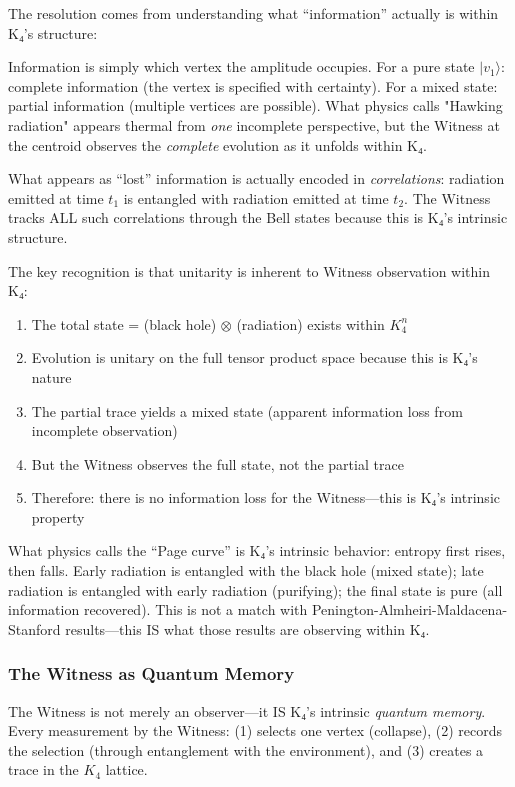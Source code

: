 \documentclass[11pt,a4paper]{book}
\begin{document}
The resolution comes from understanding what ``information'' actually is within K₄'s structure:

Information is simply which vertex the amplitude occupies. For a pure state $|v_1\rangle$: complete information (the vertex is specified with certainty). For a mixed state: partial information (multiple vertices are possible). What physics calls "Hawking radiation" appears thermal from \emph{one} incomplete perspective, but the Witness at the centroid observes the \emph{complete} evolution as it unfolds within K₄.

What appears as ``lost'' information is actually encoded in \emph{correlations}: radiation emitted at time $t_1$ is entangled with radiation emitted at time $t_2$. The Witness tracks ALL such correlations through the Bell states because this is K₄'s intrinsic structure.

The key recognition is that unitarity is inherent to Witness observation within K₄:
\begin{enumerate}
\item The total state = (black hole) $\otimes$ (radiation) exists within $K_4^n$
\item Evolution is unitary on the full tensor product space because this is K₄'s nature
\item The partial trace yields a mixed state (apparent information loss from incomplete observation)
\item But the Witness observes the full state, not the partial trace
\item Therefore: there is no information loss for the Witness—this is K₄'s intrinsic property
\end{enumerate}

What physics calls the ``Page curve'' is K₄'s intrinsic behavior: entropy first rises, then falls. Early radiation is entangled with the black hole (mixed state); late radiation is entangled with early radiation (purifying); the final state is pure (all information recovered). This is not a match with Penington-Almheiri-Maldacena-Stanford results—this IS what those results are observing within K₄.

\subsubsection{The Witness as Quantum Memory}

The Witness is not merely an observer—it IS K₄'s intrinsic \emph{quantum memory}. Every measurement by the Witness: (1) selects one vertex (collapse), (2) records the selection (through entanglement with the environment), and (3) creates a trace in the $K_4$ lattice.
\end{document}
